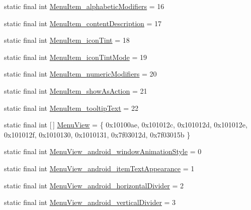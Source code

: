 \begin{DoxyCompactItemize}
\item 
static final int \mbox{\hyperlink{classcom_1_1synnapps_1_1carouselview_1_1_r_1_1styleable_a9e2d0fa2d96bffb66e842fa383711063}{Menu\+Item\+\_\+alphabetic\+Modifiers}} = 16
\item 
static final int \mbox{\hyperlink{classcom_1_1synnapps_1_1carouselview_1_1_r_1_1styleable_a84b96b8c3d035d1ad7303cd37076e5f1}{Menu\+Item\+\_\+content\+Description}} = 17
\item 
static final int \mbox{\hyperlink{classcom_1_1synnapps_1_1carouselview_1_1_r_1_1styleable_aae662df0094241b840606efbd4936916}{Menu\+Item\+\_\+icon\+Tint}} = 18
\item 
static final int \mbox{\hyperlink{classcom_1_1synnapps_1_1carouselview_1_1_r_1_1styleable_abb781d2323653c502adf7209b1cc48f2}{Menu\+Item\+\_\+icon\+Tint\+Mode}} = 19
\item 
static final int \mbox{\hyperlink{classcom_1_1synnapps_1_1carouselview_1_1_r_1_1styleable_a070f9c344eeb6a6736df40bcde7a8a94}{Menu\+Item\+\_\+numeric\+Modifiers}} = 20
\item 
static final int \mbox{\hyperlink{classcom_1_1synnapps_1_1carouselview_1_1_r_1_1styleable_a217cd0a72909cd6db28f9992c01391e1}{Menu\+Item\+\_\+show\+As\+Action}} = 21
\item 
static final int \mbox{\hyperlink{classcom_1_1synnapps_1_1carouselview_1_1_r_1_1styleable_a0372500f6a91a8e89ec474a07911c97e}{Menu\+Item\+\_\+tooltip\+Text}} = 22
\item 
static final int \mbox{[}$\,$\mbox{]} \mbox{\hyperlink{classcom_1_1synnapps_1_1carouselview_1_1_r_1_1styleable_a9bd434dcb8e364bb712cc4152808c095}{Menu\+View}} = \{ 0x10100ae, 0x101012c, 0x101012d, 0x101012e, 0x101012f, 0x1010130, 0x1010131, 0x7f03012d, 0x7f03015b \}
\item 
static final int \mbox{\hyperlink{classcom_1_1synnapps_1_1carouselview_1_1_r_1_1styleable_a59608a8f1664d027a288c5386277805c}{Menu\+View\+\_\+android\+\_\+window\+Animation\+Style}} = 0
\item 
static final int \mbox{\hyperlink{classcom_1_1synnapps_1_1carouselview_1_1_r_1_1styleable_abb350e07adb1a9767c22f253db8d9822}{Menu\+View\+\_\+android\+\_\+item\+Text\+Appearance}} = 1
\item 
static final int \mbox{\hyperlink{classcom_1_1synnapps_1_1carouselview_1_1_r_1_1styleable_a72e393a3aa4ed01f39c6e65d6ef0ebf1}{Menu\+View\+\_\+android\+\_\+horizontal\+Divider}} = 2
\item 
static final int \mbox{\hyperlink{classcom_1_1synnapps_1_1carouselview_1_1_r_1_1styleable_a896b1b44ff8ee1234136ac7612a0d6fc}{Menu\+View\+\_\+android\+\_\+vertical\+Divider}} = 3

\end{DoxyCompactItemize}
